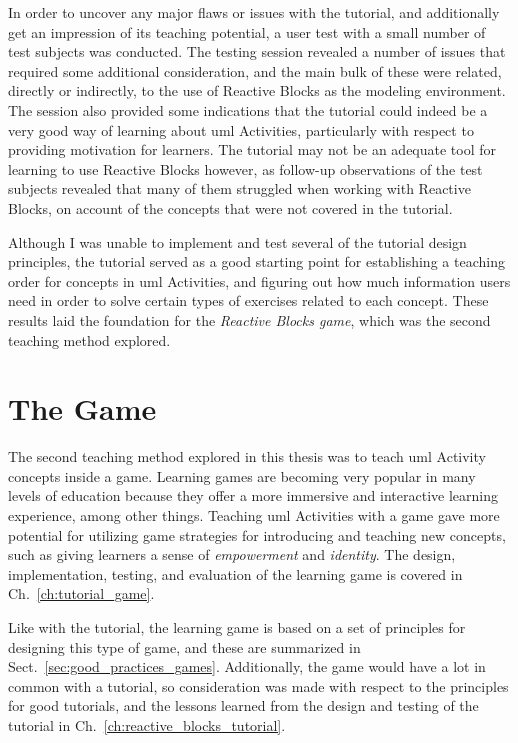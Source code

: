\noindent
In order to uncover any major flaws or issues with the tutorial, and additionally get an impression of its teaching potential, a user test with a small number of test subjects was conducted. The testing session revealed a number of issues that required some additional consideration, and the main bulk of these were related, directly or indirectly, to the use of Reactive Blocks as the modeling environment. The session also provided some indications that the tutorial could indeed be a very good way of learning about \gls{uml} Activities, particularly with respect to providing motivation for learners. The tutorial may not be an adequate tool for learning to use Reactive Blocks however, as follow-up observations of the test subjects revealed that many of them struggled when working with Reactive Blocks, on account of the concepts that were not covered in the tutorial.

\noindent
Although I was unable to implement and test several of the tutorial design principles, the tutorial served as a good starting point for establishing a teaching order for concepts in \gls{uml} Activities, and figuring out how much information users need in order to solve certain types of exercises related to each concept. These results laid the foundation for the \emph{Reactive Blocks game}, which was the second teaching method explored.

\section{The Game}
\label{sec:discussion_game}
The second teaching method explored in this thesis was to teach \gls{uml} Activity concepts inside a game. Learning games are becoming very popular in many levels of education because they offer a more immersive and interactive learning experience, among other things. Teaching \gls{uml} Activities with a game gave more potential for utilizing game strategies for introducing and teaching new concepts, such as giving learners a sense of \emph{empowerment} and \emph{identity}. The design, implementation, testing, and evaluation of the learning game is covered in Ch.~\ref{ch:tutorial_game}.

\noindent
Like with the tutorial, the learning game is based on a set of principles for designing this type of game, and these are summarized in Sect.~\ref{sec:good_practices_games}. Additionally, the game would have a lot in common with a tutorial, so consideration was made with respect to the principles for good tutorials, and the lessons learned from the design and testing of the tutorial in Ch.~\ref{ch:reactive_blocks_tutorial}.

